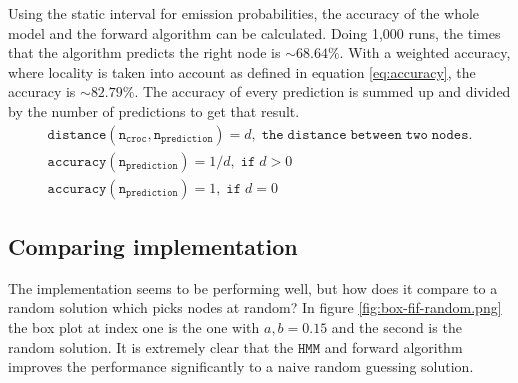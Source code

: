 \documentclass[12pt, a4paper]{article}
\newcommand{\HMM}[0]{%
  \mathtt{HMM}
}
\begin{document}
Using the static interval for emission probabilities, the accuracy of the whole model and the forward algorithm can be calculated. Doing 1,000 runs, the times that the algorithm predicts the right node is $\sim68.64\%$. With a weighted accuracy, where locality is taken into account as defined in equation \ref{eq:accuracy}, the accuracy is $\sim82.79\%$. The accuracy of every prediction is summed up and divided by the number of predictions to get that result.
\begin{equation}\label{eq:accuracy}
\begin{split}
\mathtt{distance(n_{croc}, n_{prediction})}=d, \; \mathtt{the \; distance \; between \; two \; nodes.}
\\
\mathtt{accuracy(n_{prediction})} = 1 / d, \; \mathtt{if} \; d > 0 \hspace{151pt}
\\
\mathtt{accuracy(n_{prediction})} = 1, \; \mathtt{if} \; d = 0 \hspace{163pt}
\end{split}
\end{equation}



\subsection{Comparing implementation}

The implementation seems to be performing well, but how does it compare to a random solution which picks nodes at random? In figure \ref{fig:box-fif-random.png} the box plot at index one is the one with $a,b=0.15$ and the second is the random solution. It is extremely clear that the $\HMM$ and forward algorithm improves the performance significantly to a naive random guessing solution.
\end{document}

